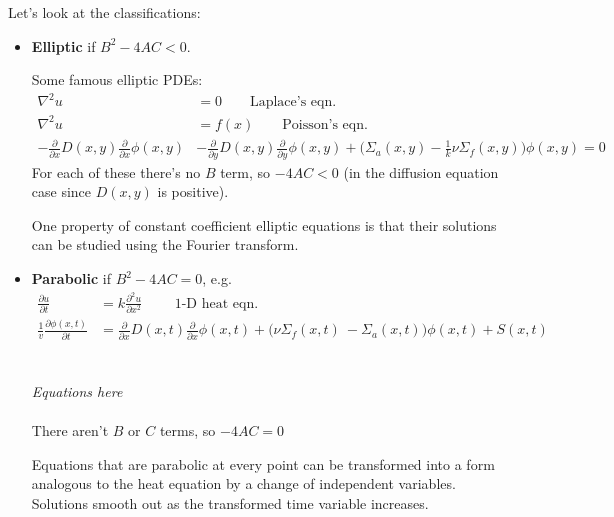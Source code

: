 \documentclass[12pt, answers]{exam}
\newcommand{\Macro}{\ensuremath{\Sigma}}
\begin{document}
Let's look at the classifications:
\begin{itemize}
\item \textbf{Elliptic} if $B^2 - 4 AC < 0$. %

Some famous elliptic PDEs:
\begin{align*}
\nabla^2 u &= 0 \qquad \text{Laplace's eqn.} \nonumber \\
\nabla^2 u &= f(x) \qquad \text{Poisson's eqn.} \nonumber \\
-\frac{\partial}{\partial x}D(x,y)\frac{\partial}{\partial x}\phi(x,y) &- \frac{\partial}{\partial y}D(x,y)\frac{\partial}{\partial y}\phi(x,y) + \bigl(\Macro_a(x,y) - \frac{1}{k} \nu \Macro_f(x,y)\bigr) \phi(x,y) = 0\nonumber
\end{align*}
For each of these there's no $B$ term, so $-4AC < 0$ (in the diffusion equation case since $D(x,y)$ is positive).

One property of constant coefficient elliptic equations is that their solutions can be studied using the Fourier transform. %

\item \textbf{Parabolic} if $B^2 - 4 AC = 0$, e.g.
\ifprintanswers
\begin{align}
\frac{\partial u}{\partial t} &= k \frac{\partial^2 u}{\partial x^2} \qquad \text{ 1-D heat eqn.} \nonumber \\
\frac{1}{v}\frac{\partial \phi(x,t)}{\partial t} &= \frac{\partial}{\partial x}D(x,t)\frac{\partial}{\partial x}\phi(x,t) + \bigl(\nu \Macro_f(x,t)\ - \Macro_a(x,t)\bigr) \phi(x,t) + S(x,t)\nonumber
\end{align}
\else
 \\ \\ \hspace*{8em}\textit{Equations here}\\ \\
\fi
There aren't $B$ or $C$ terms, so $-4AC = 0$

Equations that are parabolic at every point can be transformed into a form analogous to the heat equation by a change of independent variables. Solutions smooth out as the transformed time variable increases.
\end{itemize}
\end{document}
